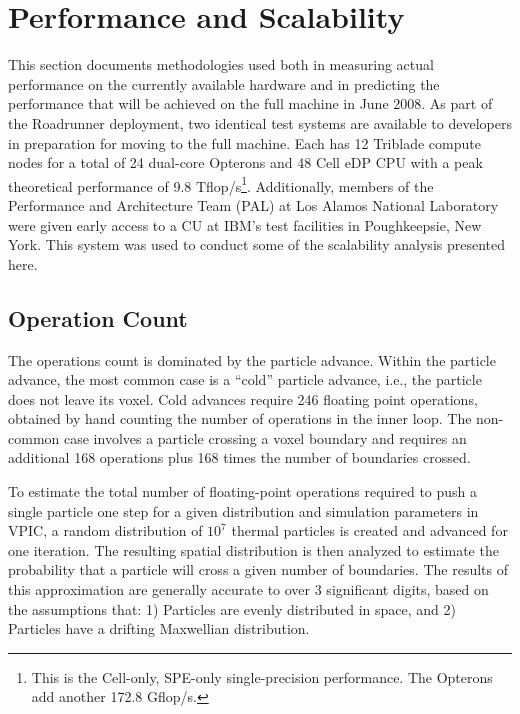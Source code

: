 \documentclass[letter,10pt]{article}
\begin{document}
\section{Performance and Scalability} \label{sec:performance}

This section documents methodologies used both in measuring actual
performance on the currently available hardware and in predicting the
performance that will be achieved on the full machine in June
2008.  As part of the Roadrunner deployment, two identical test
systems are available to developers in preparation for moving to the
full machine.  Each has 12 Triblade compute nodes for a total of 24 
dual-core Opterons and 48 Cell eDP CPU with a peak theoretical 
performance of 9.8 Tflop/s\footnote{This is the Cell-only, SPE-only
single-precision performance.  
The Opterons add another 172.8 Gflop/s.}.  
Additionally, members of the
Performance and Architecture Team (PAL) at Los Alamos National
Laboratory were given early access to a CU at IBM's test facilities in
Poughkeepsie, New York.  This system was used to conduct some of the
scalability analysis presented here.

\subsection{Operation Count}

The operations count is dominated by the particle advance.  Within the
particle advance, the most common case is a ``cold'' particle advance,
i.e., the particle does not leave its voxel.  Cold 
advances require 246 floating point operations, obtained by hand
counting the number of %
operations in the inner loop.  The non-common case involves a particle
crossing a voxel boundary and requires an additional 168 operations plus 
168 times the number of boundaries crossed.

To estimate the total number of floating-point operations required to
push a single particle one step for a given distribution and
simulation parameters in VPIC, a random distribution of $10^7$ thermal
particles is created and advanced for one iteration.  The resulting
spatial distribution is then analyzed to estimate the probability that
a particle will cross a given number of boundaries.  The results of
this approximation are generally accurate to over 3 significant
digits, based on the assumptions that: 1) Particles are evenly
distributed in space, and 2) Particles have a drifting Maxwellian
distribution.
\end{document}
